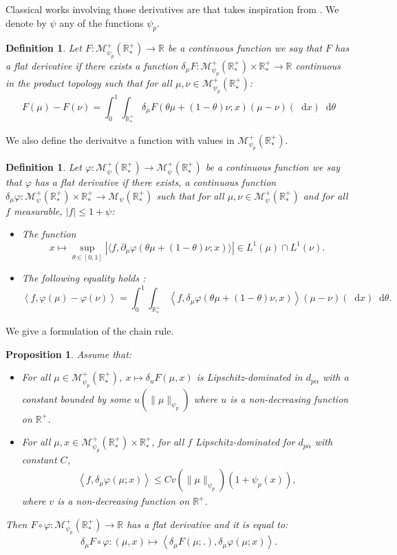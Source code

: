 \documentclass[11pt,a4paper]{article}
\newcommand{\RR}{\mathbb{R}}
\newcommand{\RRP}{\mathbb{R}^+_*}
\newcommand{\MC}{\mathcal{M}}
\newcommand{\brac}[1]{\left\langle#1\right\rangle}
\newcommand{\dd}{\mathop{}\!\mathrm{d}}
\newtheorem{proposition}[theorem]{Proposition}
\newtheorem{definition}[theorem]{Definition}
\begin{document}
Classical works involving those derivatives are \cite{martiniKolmogorovEquationsSpaces2023} that takes inspiration from \cite{cardaliaguet2019master,carmona2018probabilistic}. We denote by $\psi$ any of the functions $\psi_p$.
\begin{definition}
    Let $F: \MC^+_{\psi_p}(\RRP) \to \RR$ be a continuous function we say that $F$ has a flat derivative if there exists a function $\delta_{\mu}F :\MC^+_{\psi_p}(\RRP) \times \RRP \to \RR $ continuous in the product topology such that for all $\mu,\nu \in \MC^+_{\psi_p}(\RRP) $:
    \[ F(\mu) - F(\nu) = \int_0^1 \int_{\RRP} \delta_\mu F(\theta \mu + (1-\theta)\nu;x)\left(\mu - \nu\right)(\dd x)\dd \theta\]
\end{definition}
We also define the derivaitve a function with values in $\MC^+_{\psi_p}(\RRP) $.
\begin{definition}
     Let $\varphi: \MC^+_{\psi}(\RRP) \to \MC^+_{\psi}(\RRP)$ be a continuous function we say that $\varphi$ has a flat derivative if there exists, a continuous function $\delta_{\mu}\varphi :\MC^+_{\psi}(\RRP) \times \RRP \to \MC_{\psi}(\RRP)$ such that for all $\mu,\nu \in \MC^+_{\psi}(\RRP)$ and for all $f$ measurable, $|f| \leq 1 + \psi$:
     \begin{itemize}
         \item The function
         \[x \mapsto \sup_{\theta \in [0,1]} |\langle f, \partial_\mu\varphi(\theta \mu + (1-\theta) \nu;x) \rangle| \in L^1(\mu) \cap L^1(\nu).\]
        \item The following equality holds :
            \[ \left\langle f,\varphi(\mu) - \varphi(\nu) \right\rangle= \int_0^1 \int_{\RRP} \left\langle f,\delta_\mu \varphi(\theta \mu + (1-\theta)\nu,x)\right\rangle\left(\mu - \nu\right)(\dd x)\dd \theta.\]
     \end{itemize}
\end{definition}
We give a formulation of the chain rule.
\begin{proposition}\label{prop:chain-rule}
    Assume that:
    \begin{itemize}
        \item For all $\mu \in \MC^+_{\psi_p}(\RRP)$, $x \mapsto \delta_u F(\mu,x)$ is Lipschitz-dominated in $d_{p\alpha}$ with a constant bounded by some $u(\|\mu\|_{\psi_p})$ where $u$ is a non-decreasing function on $\RR^+$.
        \item For all $\mu,x \in \MC^+_{\psi_p}(\RRP)\times \RRP$, for all $f$ Lipschitz-dominated for $d_{p\alpha}$ with constant $C$, 
        \begin{align*}
            \brac{f, \delta_\mu \varphi(\mu;x)} \leq Cv(\|\mu\|_{\psi_p})(1 + \psi_p(x)), 
        \end{align*}
        where $v$ is a non-decreasing function on $\RR^+$.
    \end{itemize}
    Then \(F\circ \varphi : \MC_{\psi_p}^+(\RRP) \to \RR\) has a flat derivative and it is equal to:
    \[
    \delta_\mu F\circ \varphi : \left(\mu,x \right) \mapsto \brac{\delta_\mu  F(\mu;.),\delta_\mu\varphi(\mu;x)}.
    \]
\end{proposition}
\end{document}
